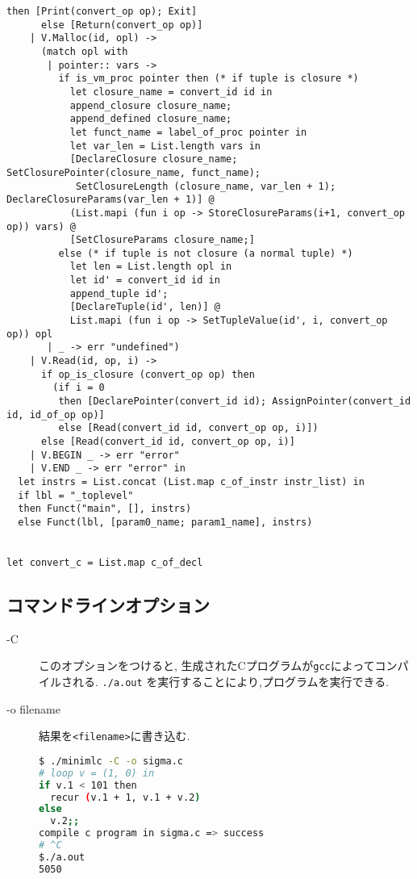 \begin{lstlisting}[caption=backend.ml - C言語への変換]
      then [Print(convert_op op); Exit]
      else [Return(convert_op op)]
    | V.Malloc(id, opl) ->
      (match opl with
       | pointer:: vars ->
         if is_vm_proc pointer then (* if tuple is closure *)
           let closure_name = convert_id id in
           append_closure closure_name;
           append_defined closure_name;
           let funct_name = label_of_proc pointer in
           let var_len = List.length vars in
           [DeclareClosure closure_name; SetClosurePointer(closure_name, funct_name);
            SetClosureLength (closure_name, var_len + 1); DeclareClosureParams(var_len + 1)] @
           (List.mapi (fun i op -> StoreClosureParams(i+1, convert_op op)) vars) @
           [SetClosureParams closure_name;]
         else (* if tuple is not closure (a normal tuple) *)
           let len = List.length opl in
           let id' = convert_id id in
           append_tuple id';
           [DeclareTuple(id', len)] @
           List.mapi (fun i op -> SetTupleValue(id', i, convert_op op)) opl
       | _ -> err "undefined")
    | V.Read(id, op, i) -> 
      if op_is_closure (convert_op op) then 
        (if i = 0 
         then [DeclarePointer(convert_id id); AssignPointer(convert_id id, id_of_op op)]
         else [Read(convert_id id, convert_op op, i)])
      else [Read(convert_id id, convert_op op, i)]
    | V.BEGIN _ -> err "error"
    | V.END _ -> err "error" in
  let instrs = List.concat (List.map c_of_instr instr_list) in
  if lbl = "_toplevel" 
  then Funct("main", [], instrs)
  else Funct(lbl, [param0_name; param1_name], instrs)


let convert_c = List.map c_of_decl 
\end{lstlisting}


\subsection*{コマンドラインオプション}

\begin{description}
\item[-C] \hfill
このオプションをつけると, 生成されたCプログラムが\lstinline{gcc}によってコンパイルされる. \lstinline{./a.out} を実行することにより,プログラムを実行できる.

\item[-o filename] \hfill
結果を\lstinline{<filename>}に書き込む.

\begin{lstlisting}[caption=実行例, language=bash]
$ ./minimlc -C -o sigma.c
# loop v = (1, 0) in
if v.1 < 101 then
  recur (v.1 + 1, v.1 + v.2)
else
  v.2;;
compile c program in sigma.c => success
# ^C
$./a.out
5050

\end{lstlisting}
\end{description}






